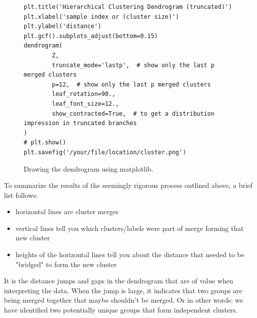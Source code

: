 \documentclass[msc,oneside]{ubcthesis}%
\begin{document}
\begin{figure}[H]
\begin{lstlisting}
plt.title('Hierarchical Clustering Dendrogram (truncated)')
plt.xlabel('sample index or (cluster size)')
plt.ylabel('distance')
plt.gcf().subplots_adjust(bottom=0.15)
dendrogram(
        Z,
        truncate_mode='lastp',  # show only the last p merged clusters
        p=12,  # show only the last p merged clusters
        leaf_rotation=90.,
        leaf_font_size=12.,
        show_contracted=True,  # to get a distribution impression in truncated branches
)
# plt.show()
plt.savefig('/your/file/location/cluster.png')
\end{lstlisting}
\caption[Drawing the dendrogram using matplotlib]{
Drawing the dendrogram using matplotlib.}
\label{fig:matplotlibdend}
\end{figure}

To summarize the results of the seemingly rigorous process outlined above, a brief list follows:
\begin{itemize}
\item{horizontal lines are cluster merges}
\item{vertical lines tell you which clusters/labels were part of merge forming that new cluster}
\item{heights of the horizontal lines tell you about the distance that needed to be "bridged" to form the new cluster}
\end{itemize}
It is the distance jumps and gaps in the dendrogram that are of value when interpreting the data. When the jump is large, it indicates that two groups are being merged together that maybe shouldn't be merged. Or in other words: we have identified two potentially unique groups that form independent clusters.
\end{document}

